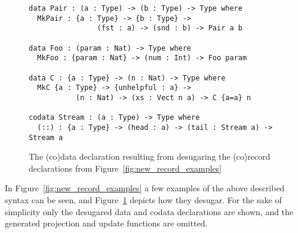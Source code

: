 \begin{figure}[h]
\begin{lstlisting}
data Pair : (a : Type) -> (b : Type) -> Type where
  MkPair : {a : Type} -> {b : Type} -> 
                (fst : a) -> (snd : b) -> Pair a b

data Foo : (param : Nat) -> Type where
  MkFoo : {param : Nat} -> (num : Int) -> Foo param

data C : {a : Type} -> (n : Nat) -> Type where
  MkC {a : Type} -> {unhelpful : a} -> 
           (n : Nat) -> (xs : Vect n a) -> C {a=a} n

codata Stream : (a : Type) -> Type where
  (::) : {a : Type} -> (head : a) -> (tail : Stream a) -> Stream a
\end{lstlisting}
  \caption{The (co)data declaration resulting from desugaring the (co)record
    declarations from Figure~\ref{fig:new_record_examples}}
  \label{fig:new_record_examples_desugared}
\end{figure}

In Figure~\ref{fig:new_record_examples} a few examples of the above described
syntax can be seen, and Figure~\ref{fig:new_record_examples_desugared} depicts how
they desugar. For the sake of simplicity only the desugared data and codata
declarations are shown, and the generated projection and update functions are omitted.

